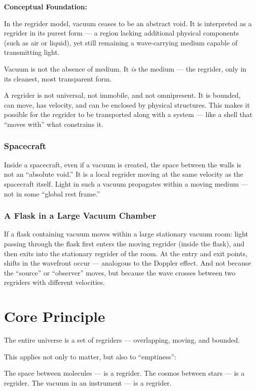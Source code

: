 \documentclass[12pt]{article}
\begin{document}
\textbf{Conceptual Foundation:}

In the regrider model, vacuum ceases to be an abstract void. It is interpreted as a regrider in its purest form — a region lacking additional physical components (such as air or liquid), yet still remaining a wave-carrying medium capable of transmitting light.

Vacuum is not the absence of medium. It \textit{is} the medium — the regrider, only in its cleanest, most transparent form.

A regrider is not universal, not immobile, and not omnipresent. It is bounded, can move, has velocity, and can be enclosed by physical structures. This makes it possible for the regrider to be transported along with a system — like a shell that “moves with” what constrains it.

\subsubsection*{Spacecraft}
Inside a spacecraft, even if a vacuum is created, the space between the walls is not an “absolute void.” It is a local regrider moving at the same velocity as the spacecraft itself. Light in such a vacuum propagates within a moving medium — not in some “global rest frame.”

\subsubsection*{A Flask in a Large Vacuum Chamber}
If a flask containing vacuum moves within a large stationary vacuum room:  
light passing through the flask first enters the moving regrider (inside the flask),  
and then exits into the stationary regrider of the room.  
At the entry and exit points, shifts in the wavefront occur — analogous to the Doppler effect.  
And not because the “source” or “observer” moves, but because the wave crosses between two regriders with different velocities.

\section*{Core Principle}

The entire universe is a set of regriders — overlapping, moving, and bounded.

This applies not only to matter, but also to “emptiness”:

The space between molecules — is a regrider.  
The cosmos between stars — is a regrider.  
The vacuum in an instrument — is a regrider.
\end{document}
